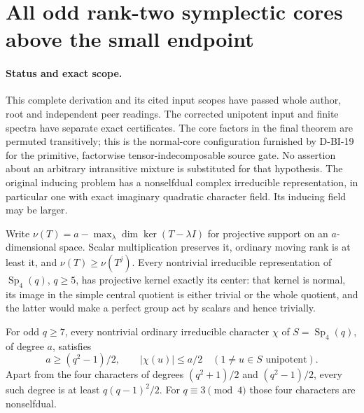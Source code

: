 \section{All odd rank-two symplectic cores above the small endpoint}
\label{sec:odd-c2-all-fields}

\paragraph{Status and exact scope.}
This complete derivation and its cited input scopes have passed whole
author, root and independent peer readings. The corrected unipotent
input and finite spectra have separate exact certificates.
The core factors in the final theorem are permuted transitively;
this is the normal-core configuration furnished by D-BI-19 for the
primitive, factorwise tensor-indecomposable source gate. No assertion
about an arbitrary intransitive mixture is substituted for that
hypothesis. The original inducing problem has a nonselfdual complex
irreducible representation, in particular one with exact imaginary
quadratic character field. Its inducing field may be larger.

Write $\nu(T)=a-\max_\lambda\dim\ker(T-\lambda I)$ for projective
support on an $a$-dimensional space. Scalar multiplication preserves it,
ordinary moving rank is at least it, and $\nu(T)\ge\nu(T^j)$.
Every nontrivial irreducible representation of $\operatorname{Sp}_4(q)$,
$q\ge5$, has projective kernel exactly its center: that kernel is
normal, its image in the simple central quotient is either trivial
or the whole quotient, and the latter would make a perfect group
act by scalars and hence trivially.

\begin{lemma}
\label{D-OC2-01}
For odd $q\ge7$, every nontrivial ordinary irreducible character $\chi$
of $S=\operatorname{Sp}_4(q)$, of degree $a$, satisfies
\[
 a\ge(q^2-1)/2,\qquad |\chi(u)|\le a/2
       \quad(1\ne u\in S\text{ unipotent}).                 \tag{OC2.1}
\]
Apart from the four characters of degrees $(q^2+1)/2$ and
$(q^2-1)/2$, every such degree is at least $q(q-1)^2/2$.
For $q\equiv3\pmod4$ those four characters are nonselfdual.
\end{lemma}

